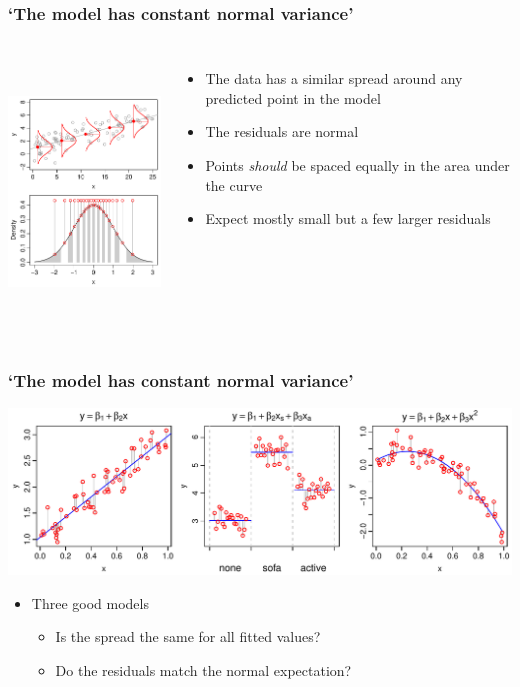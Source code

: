 \documentclass[aspectratio=43]{beamer}
\begin{document}
\begin{frame}[T]
\frametitle{`The model has constant normal variance'}
\begin{columns}[T]

		\includegraphics[height=72mm]{ResidDemo.pdf}
		
		\begin{itemize}
		\item The data has a similar spread around any predicted point in the model
		\vspace{2cm}
		\item The residuals are normal
		\item Points {\it should} be spaced equally in the area under the curve
		\item Expect mostly small but a few larger residuals
		\end{itemize}
		
\end{columns}
\end{frame}

\begin{frame}[T]
\frametitle{`The model has constant normal variance'}

\includegraphics[width=\textwidth]{ConstantVarianceMods.pdf}

\begin{itemize}
\item Three good models
\begin{itemize}
\item Is the spread the same for all fitted values?
\item Do the residuals match the normal expectation?
\end{itemize}
\end{itemize}


\end{frame}
\end{document}
